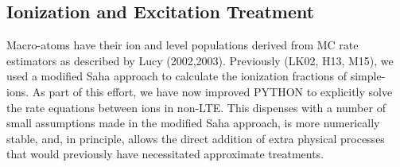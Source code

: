 \documentclass[useAMS,usenatbib]{mn2e_x}
\begin{document}
\subsection{Ionization and Excitation Treatment}

Macro-atoms have their ion and level populations derived from
MC rate estimators as described by Lucy (2002,2003). 
Previously (LK02, H13, M15), we used a modified Saha approach to 
calculate the ionization fractions
of simple-ions. As part of  this effort, we have 
now improved {\sc PYTHON} to explicitly solve the 
rate equations between ions in non-LTE. This dispenses with a number of small assumptions 
made in the modified Saha approach, is more numerically stable, and, in principle, allows 
the direct addition of extra physical processes that would previously have necessitated 
approximate treatments.
\end{document}
